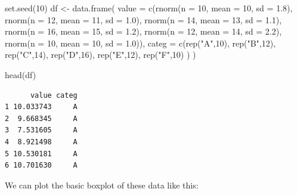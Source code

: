 \documentclass[
  letterpaper,
  DIV=11,
  numbers=noendperiod]{scrreprt}
\newenvironment{Shaded}{\begin{snugshade}}{\end{snugshade}}
\newcommand{\AttributeTok}[1]{\textcolor[rgb]{0.40,0.45,0.13}{#1}}
\newcommand{\DecValTok}[1]{\textcolor[rgb]{0.68,0.00,0.00}{#1}}
\newcommand{\FloatTok}[1]{\textcolor[rgb]{0.68,0.00,0.00}{#1}}
\newcommand{\FunctionTok}[1]{\textcolor[rgb]{0.28,0.35,0.67}{#1}}
\newcommand{\NormalTok}[1]{\textcolor[rgb]{0.00,0.23,0.31}{#1}}
\newcommand{\OtherTok}[1]{\textcolor[rgb]{0.00,0.23,0.31}{#1}}
\newcommand{\StringTok}[1]{\textcolor[rgb]{0.13,0.47,0.30}{#1}}
\begin{document}
\begin{Shaded}
\begin{Highlighting}[]
\FunctionTok{set.seed}\NormalTok{(}\DecValTok{10}\NormalTok{)}
\NormalTok{df }\OtherTok{\textless{}{-}} \FunctionTok{data.frame}\NormalTok{(}
  \AttributeTok{value =} \FunctionTok{c}\NormalTok{(}\FunctionTok{rnorm}\NormalTok{(}\AttributeTok{n =} \DecValTok{10}\NormalTok{, }\AttributeTok{mean =} \DecValTok{10}\NormalTok{, }\AttributeTok{sd =} \FloatTok{1.8}\NormalTok{),}
            \FunctionTok{rnorm}\NormalTok{(}\AttributeTok{n =} \DecValTok{12}\NormalTok{, }\AttributeTok{mean =} \DecValTok{11}\NormalTok{, }\AttributeTok{sd =} \FloatTok{1.0}\NormalTok{),}
            \FunctionTok{rnorm}\NormalTok{(}\AttributeTok{n =} \DecValTok{14}\NormalTok{, }\AttributeTok{mean =} \DecValTok{13}\NormalTok{, }\AttributeTok{sd =} \FloatTok{1.1}\NormalTok{),}
            \FunctionTok{rnorm}\NormalTok{(}\AttributeTok{n =} \DecValTok{16}\NormalTok{, }\AttributeTok{mean =} \DecValTok{15}\NormalTok{, }\AttributeTok{sd =} \FloatTok{1.2}\NormalTok{),}
            \FunctionTok{rnorm}\NormalTok{(}\AttributeTok{n =} \DecValTok{12}\NormalTok{, }\AttributeTok{mean =} \DecValTok{14}\NormalTok{, }\AttributeTok{sd =} \FloatTok{2.2}\NormalTok{),}
            \FunctionTok{rnorm}\NormalTok{(}\AttributeTok{n =} \DecValTok{10}\NormalTok{, }\AttributeTok{mean =} \DecValTok{10}\NormalTok{, }\AttributeTok{sd =} \FloatTok{1.0}\NormalTok{)),}
  \AttributeTok{categ =} \FunctionTok{c}\NormalTok{(}\FunctionTok{rep}\NormalTok{(}\StringTok{"A"}\NormalTok{,}\DecValTok{10}\NormalTok{), }\FunctionTok{rep}\NormalTok{(}\StringTok{"B"}\NormalTok{,}\DecValTok{12}\NormalTok{), }\FunctionTok{rep}\NormalTok{(}\StringTok{"C"}\NormalTok{,}\DecValTok{14}\NormalTok{), }
          \FunctionTok{rep}\NormalTok{(}\StringTok{"D"}\NormalTok{,}\DecValTok{16}\NormalTok{), }\FunctionTok{rep}\NormalTok{(}\StringTok{"E"}\NormalTok{,}\DecValTok{12}\NormalTok{), }\FunctionTok{rep}\NormalTok{(}\StringTok{"F"}\NormalTok{,}\DecValTok{10}\NormalTok{)}
\NormalTok{          )}
\NormalTok{)}

\FunctionTok{head}\NormalTok{(df)}
\end{Highlighting}
\end{Shaded}

\begin{verbatim}
      value categ
1 10.033743     A
2  9.668345     A
3  7.531605     A
4  8.921498     A
5 10.530181     A
6 10.701630     A
\end{verbatim}

We can plot the basic boxplot of these data like this:
\end{document}
